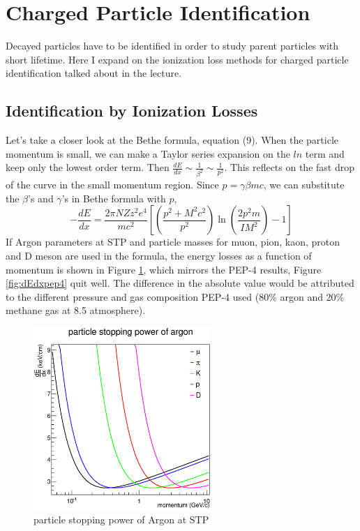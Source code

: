 \documentclass[11pt]{article} %
\begin{document}

\section{Charged Particle Identification}

Decayed particles have to be identified in order to study parent particles with short lifetime. Here I expand on the ionization loss methods for charged particle identification talked about in the lecture.

\subsection{Identification by Ionization Losses}

Let's take a closer look at the Bethe formula, equation (9). When the particle momentum is small, we can make a Taylor series expansion on the $ln$ term and keep only the lowest order term. Then $\frac{dE}{dx}\sim \frac{1}{\beta^2} \sim \frac{1}{p^2}$. This reflects on the fast drop of the curve in the small momentum region. Since $p=\gamma\beta mc$, we can substitute the $\beta$'s and $\gamma$'s in Bethe formula with $p$,
\begin{equation}
-\frac{dE}{dx}=\frac{2\pi NZz^2e^4}{mc^2}\left[ \left( \frac{p^2+M^2c^2}{p^2} \right)  \ln\left( \frac{2p^2m}{IM^2} \right) -1 \right]
\end{equation}
If Argon parameters at STP and particle masses for muon, pion, kaon, proton and D meson are used in the formula, the energy losses as a function of momentum is shown in Figure \ref{fig:dEdxcurve}, which mirrors the PEP-4 results, Figure \ref{fig:dEdxpep4} quit well. The difference in the absolute value would be attributed to the different pressure and gas composition PEP-4 used (80\% argon and 20\% methane gas at 8.5 atmosphere).

\begin{figure}
    \centering
    \includegraphics[width=0.6\textwidth]{plots/dEdx.eps}
    \caption{particle stopping power of Argon at STP}
    \label{fig:dEdxcurve}
\end{figure}
\end{document}
